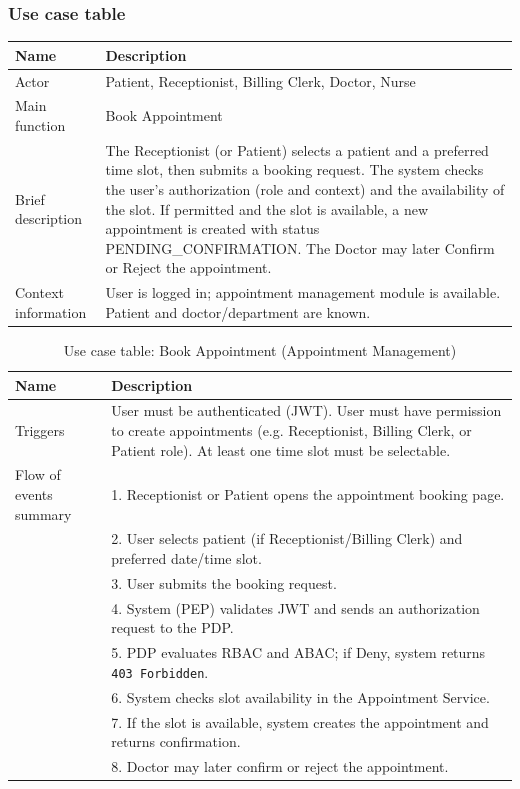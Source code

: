 \subsubsection{Use case table}
\begin{table}[H]
\centering
\label{tab:uc-appointment}
\begin{tabular}{|l|p{9cm}|}
\hline
\textbf{Name} & \textbf{Description} \\
\hline
Actor & Patient, Receptionist, Billing Clerk, Doctor, Nurse \\
\hline
Main function & Book Appointment \\
\hline
Brief description & The Receptionist (or Patient) selects a patient and a preferred time slot, then submits a booking request. The system checks the user's authorization (role and context) and the availability of the slot. If permitted and the slot is available, a new appointment is created with status PENDING\_CONFIRMATION. The Doctor may later Confirm or Reject the appointment. \\
\hline
Context information & User is logged in; appointment management module is available. Patient and doctor/department are known. \\
\hline
\end{tabular}

\end{table}




\begin{table}[H]
\centering
\begin{tabular}{|l|p{9cm}|}
\hline
\textbf{Name} & \textbf{Description} \\
\hline
Triggers & User must be authenticated (JWT). User must have permission to create appointments (e.g. Receptionist, Billing Clerk, or Patient role). At least one time slot must be selectable. \\
\hline
Flow of events summary & 
1. Receptionist or Patient opens the appointment booking page. \\
& 2. User selects patient (if Receptionist/Billing Clerk) and preferred date/time slot. \\
& 3. User submits the booking request. \\
& 4. System (PEP) validates JWT and sends an authorization request to the PDP. \\
& 5. PDP evaluates RBAC and ABAC; if Deny, system returns \texttt{403 Forbidden}. \\
& 6. System checks slot availability in the Appointment Service. \\
& 7. If the slot is available, system creates the appointment and returns confirmation. \\
& 8. Doctor may later confirm or reject the appointment. \\
\hline
\end{tabular}
\caption{Use case table: Book Appointment (Appointment Management)}
\label{tab:uc-appointment}
\end{table}
\vspace{1em}








